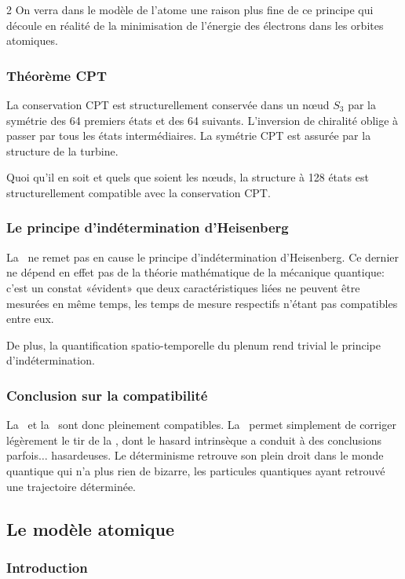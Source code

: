\begin{multicols}{2}
On verra dans le modèle de l'atome une raison plus fine de ce principe
qui découle en réalité de la minimisation de l'énergie des électrons dans les orbites atomiques.

\subsubsection{Théorème CPT}

La conservation CPT est structurellement conservée dans un nœud $S_3$
par la symétrie des 64 premiers états et des 64 suivants. L'inversion
de chiralité oblige à passer par tous les états intermédiaires. La
symétrie CPT est assurée par la structure de la turbine.

Quoi qu'il en soit et quels que soient les nœuds, la structure à 128
états est structurellement compatible avec la conservation CPT.

\subsubsection{Le principe d'indétermination d'Heisenberg}

La \PQ\ ne remet pas en cause le principe d'indétermination
d'Heisenberg. Ce dernier ne dépend en effet pas de la théorie
mathématique de la mécanique quantique: c'est un constat «évident»
que deux caractéristiques liées ne peuvent être mesurées en même temps,
les temps de mesure respectifs n'étant pas compatibles entre eux.

De plus, la quantification spatio-temporelle du plenum rend trivial le
principe d'indétermination.

\subsubsection{Conclusion sur la compatibilité}

La \PQ\ et la \MQ\ sont donc pleinement compatibles. La \PQ\ permet
simplement de corriger légèrement le tir de la \MQ, dont le hasard
intrinsèque a conduit à des conclusions parfois$\ldots$ hasardeuses. Le
déterminisme retrouve son plein droit dans le monde quantique qui n'a
plus rien de bizarre, les particules quantiques ayant retrouvé une
trajectoire déterminée.

\subsection{Le modèle atomique}

\subsubsection{Introduction}


\end{multicols}

